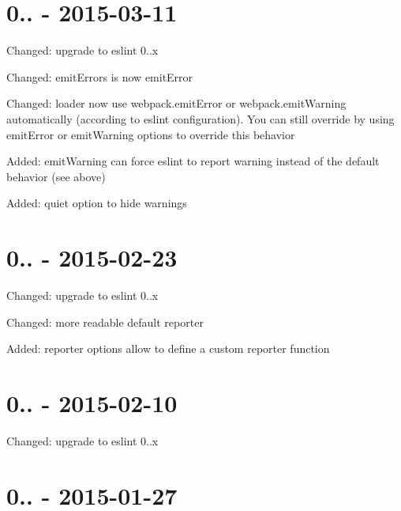 \section*{0.. -\/ 2015-\/03-\/11}


\begin{DoxyItemize}
\item Changed\+: upgrade to eslint 0..\+x
\item Changed\+: {\ttfamily emit\+Errors} is now {\ttfamily emit\+Error}
\item Changed\+: loader now use {\ttfamily webpack.\+emit\+Error} or {\ttfamily webpack.\+emit\+Warning} automatically (according to eslint configuration). You can still override by using {\ttfamily emit\+Error} or {\ttfamily emit\+Warning} options to override this behavior
\item Added\+: {\ttfamily emit\+Warning} can force eslint to report warning instead of the default behavior (see above)
\item Added\+: {\ttfamily quiet} option to hide warnings
\end{DoxyItemize}

\section*{0.. -\/ 2015-\/02-\/23}


\begin{DoxyItemize}
\item Changed\+: upgrade to eslint 0..\+x
\item Changed\+: more readable default reporter
\item Added\+: {\ttfamily reporter} options allow to define a custom reporter function
\end{DoxyItemize}

\section*{0.. -\/ 2015-\/02-\/10}


\begin{DoxyItemize}
\item Changed\+: upgrade to eslint 0..\+x
\end{DoxyItemize}

\section*{0.. -\/ 2015-\/01-\/27}


